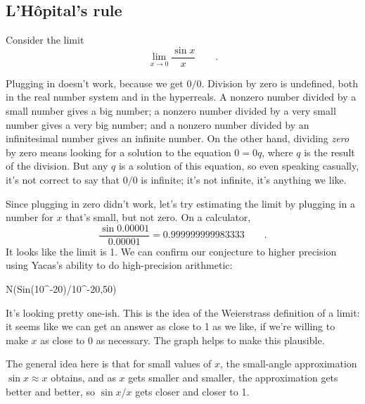 \subsection{L'H\^{o}pital's rule}

Consider the limit
\begin{equation*}
  \lim_{x\rightarrow 0} \frac{\sin x}{x} \qquad .
\end{equation*}

Plugging in doesn't work, because we get $0/0$. Division by zero is undefined, both in the real number
system and in the hyperreals. A nonzero number divided by a small number gives a big
number; a nonzero number divided by a very small number gives a very big number; and a nonzero
number divided by an infinitesimal number gives an infinite number. On the other hand,
dividing \emph{zero} by zero means looking for a solution to the equation $0=0q$, where $q$ is
the result of the division. But any $q$ is a solution of this equation, so even speaking
casually, it's not correct to say that $0/0$ is infinite; it's not infinite, it's anything
we like.

Since plugging in zero didn't work, let's try estimating the limit by plugging in a number for
$x$ that's small, but not zero. On a calculator,
\begin{equation*}
  \frac{\sin 0.00001}{0.00001} = 0.999999999983333 \qquad .
\end{equation*}
It looks like the limit is 1. We can confirm our conjecture to higher precision using Yacas's
ability to do high-precision arithmetic:
\begin{Code}
  \ii N(Sin(10^-20)/10^-20,50)
\end{Code}
It's looking pretty one-ish. This is the idea of the Weierstrass definition of a limit:
it seems like we can get an answer as close to 1 as we like, if we're willing to make $x$ as close
to 0 as necessary. The graph helps to make this plausible.


The general idea here is that for small values of $x$, the small-angle approximation $\sin x\approx x$ obtains,
and as $x$ gets smaller and smaller, the approximation gets better and better, so $\sin x/x$ gets closer and closer
to 1.

